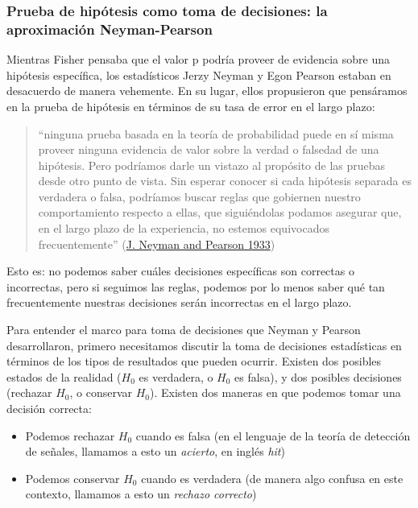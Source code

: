 \documentclass[
  12pt,
]{book}
\providecommand{\tightlist}{%
  \setlength{\itemsep}{0pt}\setlength{\parskip}{0pt}}
\begin{document}
\hypertarget{prueba-de-hipuxf3tesis-como-toma-de-decisiones-la-aproximaciuxf3n-neyman-pearson}{%
\subsubsection{Prueba de hipótesis como toma de decisiones: la aproximación Neyman-Pearson}\label{prueba-de-hipuxf3tesis-como-toma-de-decisiones-la-aproximaciuxf3n-neyman-pearson}}

Mientras Fisher pensaba que el valor p podría proveer de evidencia sobre una hipótesis específica, los estadísticos Jerzy Neyman y Egon Pearson estaban en desacuerdo de manera vehemente. En su lugar, ellos propusieron que pensáramos en la prueba de hipótesis en términos de su tasa de error en el largo plazo:

\begin{quote}
``ninguna prueba basada en la teoría de probabilidad puede en sí misma proveer ninguna evidencia de valor sobre la verdad o falsedad de una hipótesis. Pero podríamos darle un vistazo al propósito de las pruebas desde otro punto de vista. Sin esperar conocer si cada hipótesis separada es verdadera o falsa, podríamos buscar reglas que gobiernen nuestro comportamiento respecto a ellas, que siguiéndolas podamos asegurar que, en el largo plazo de la experiencia, no estemos equivocados frecuentemente'' (\protect\hyperlink{ref-Neyman289}{J. Neyman and Pearson 1933})
\end{quote}

Esto es: no podemos saber cuáles decisiones específicas son correctas o incorrectas, pero si seguimos las reglas, podemos por lo menos saber qué tan frecuentemente nuestras decisiones serán incorrectas en el largo plazo.

Para entender el marco para toma de decisiones que Neyman y Pearson desarrollaron, primero necesitamos discutir la toma de decisiones estadísticas en términos de los tipos de resultados que pueden ocurrir. Existen dos posibles estados de la realidad (\(H_0\) es verdadera, o \(H_0\) es falsa), y dos posibles decisiones (rechazar \(H_0\), o conservar \(H_0\)). Existen dos maneras en que podemos tomar una decisión correcta:

\begin{itemize}
\tightlist
\item
  Podemos rechazar \(H_0\) cuando es falsa (en el lenguaje de la teoría de detección de señales, llamamos a esto un \emph{acierto}, en inglés \emph{hit})
\item
  Podemos conservar \(H_0\) cuando es verdadera (de manera algo confusa en este contexto, llamamos a esto un \emph{rechazo correcto})
\end{itemize}
\end{document}
